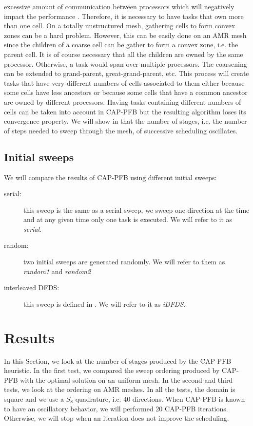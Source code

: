 \documentclass[letterpaper]{article}
\renewcommand{\(}{\left(}
\renewcommand{\)}{\right)}
\renewcommand{\[}{\left[}
\renewcommand{\]}{\right]}
\begin{document}
excessive amount of communication between processors which will negatively impact the performance
\cite{Pautz2002}. Therefore, it is necessary to have tasks that own more than
one cell. On a totally unstructured mesh, gathering cells to form convex zones
can be a hard problem. However, this can be easily done on an AMR mesh since the
children of a coarse cell can be gather to form a convex zone, i.e. the parent
cell. It is of course necessary that all the children are owned by the same
processor. Otherwise, a task would span over multiple processors. The coarsening
can be extended to grand-parent, great-grand-parent, etc. This process will create
tasks that have very different numbers of cells associated to them either
because some cells have less ancestors or because some cells that have a common
ancestor are owned by different processors. Having tasks containing different
numbers of cells can be  taken into account in CAP-PFB but the resulting
algorithm loses its convergence property. We will show in  that
the number of stages, i.e. the number of steps needed to sweep through the mesh,
of successive scheduling oscillates.

\subsection{Initial sweeps}
We will compare the results of CAP-PFB using different initial sweeps:
\begin{description}
  \item[serial:] this sweep is the same as a serial sweep, we sweep one
    direction at the time and at any given time only one task is executed. We
    will refer to it as \emph{serial}.
  \item[random:] two initial sweeps are generated randomly. We will refer to
    them as \emph{random1} and \emph{random2}
  \item[interleaved DFDS:] this sweep is defined in \cite{Pautz2002}. We will
    refer to it as \emph{iDFDS}.
\end{description}

\section{Results} \label{results}
In this Section, we look at the number of stages produced by the CAP-PFB
heuristic. In the first test, we compared the sweep ordering produced by CAP-PFB
with the optimal solution on an uniform mesh. In the second and third tests, we
look at the ordering on AMR meshes. In all the tests, the domain is square and
we use a $S_8$ quadrature, i.e. 40 directions. When CAP-PFB is known to have an
oscillatory behavior, we will performed 20 CAP-PFB iterations. Otherwise, we
will stop when an iteration does not improve the scheduling.
\end{document}
